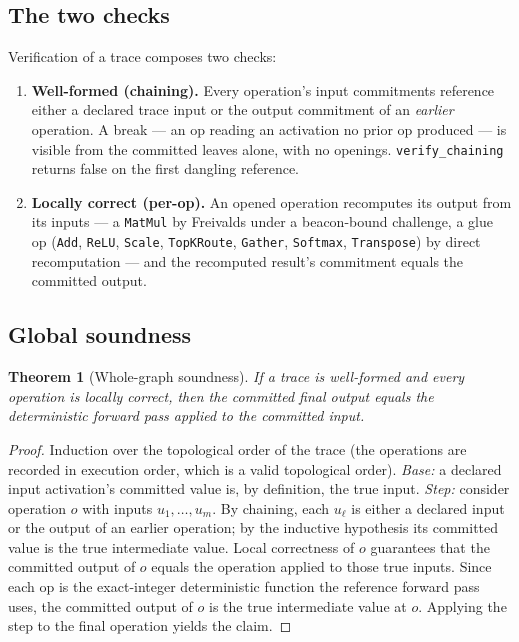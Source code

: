 \documentclass[11pt,a4paper]{article}
\newtheorem{theorem}{Theorem}
\begin{document}
\subsection{The two checks}

Verification of a trace composes two checks:
\begin{enumerate}
  \item \textbf{Well-formed (chaining).} Every operation's input commitments reference either a declared trace input or the output commitment of an \emph{earlier} operation. A break --- an op reading an activation no prior op produced --- is visible from the committed leaves alone, with no openings. \texttt{verify\_chaining} returns false on the first dangling reference.
  \item \textbf{Locally correct (per-op).} An opened operation recomputes its output from its inputs --- a \texttt{MatMul} by Freivalds under a beacon-bound challenge, a glue op (\texttt{Add}, \texttt{ReLU}, \texttt{Scale}, \texttt{TopKRoute}, \texttt{Gather}, \texttt{Softmax}, \texttt{Transpose}) by direct recomputation --- and the recomputed result's commitment equals the committed output.
\end{enumerate}

\subsection{Global soundness}

\begin{theorem}[Whole-graph soundness]\label{thm:graph}
If a trace is well-formed and every operation is locally correct, then the committed final output equals the deterministic forward pass applied to the committed input.
\end{theorem}

\begin{proof}
Induction over the topological order of the trace (the operations are recorded in execution order, which is a valid topological order). \emph{Base:} a declared input activation's committed value is, by definition, the true input. \emph{Step:} consider operation $o$ with inputs $u_1, \dots, u_m$. By chaining, each $u_\ell$ is either a declared input or the output of an earlier operation; by the inductive hypothesis its committed value is the true intermediate value. Local correctness of $o$ guarantees that the committed output of $o$ equals the operation applied to those true inputs. Since each op is the exact-integer deterministic function the reference forward pass uses, the committed output of $o$ is the true intermediate value at $o$. Applying the step to the final operation yields the claim.
\end{proof}
\end{document}
